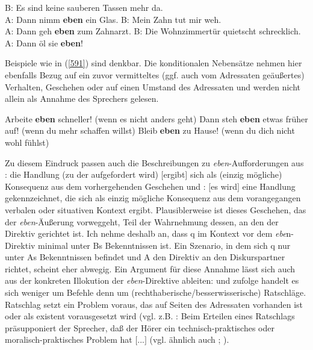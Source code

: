 \begin{exe}
	\ex\label{590} 
		\begin{xlist}	
			\ex\label{590a} B: Es sind keine sauberen Tassen mehr da.\\
							A: Dann nimm \textbf{eben} ein Glas.
			\ex\label{590b} B: Mein Zahn tut mir weh.\\
							A: Dann geh \textbf{eben} zum Zahnarzt.
			\ex\label{590c} B: Die Wohnzimmertür quietscht schrecklich.\\
							A: Dann öl sie \textbf{eben}!
			\hfill\hbox {\citet[105/101/101]{Dahl1988}}
		\end{xlist}
\end{exe}
Beispiele wie in (\ref{591}) sind denkbar. Die konditionalen Nebensätze nehmen hier ebenfalls Bezug auf ein zuvor vermitteltes (ggf. auch vom Adressaten geäußertes) Verhalten, Geschehen oder auf einen Umstand des Adressaten und werden nicht allein als Annahme des Sprechers gelesen.
\begin{exe}
	\ex\label{591} 
		\begin{xlist}	
			\ex\label{591a} Arbeite \textbf{eben} schneller! (wenn es nicht anders geht)
			\ex\label{591b} Dann steh \textbf{eben} etwas früher auf! (wenn du mehr schaffen willst)
			\ex\label{591c} Bleib \textbf{eben} zu Hause! (wenn du dich nicht wohl fühlst)
			\hfill\hbox {\citet[122]{Helbig1990}}
		\end{xlist}
\end{exe}
Zu diesem Eindruck passen auch die Beschreibungen zu \textit{eben}-Aufforderungen aus \citet[121]{Helbig1990}: \glqq die Handlung (zu der aufgefordert wird) $[$ergibt$]$ sich als (einzig mögliche) Konsequenz aus dem vorhergehenden Geschehen\grqq{}  und \citet[169]{Hentschel1986}: \glqq $[$es wird$]$ eine Handlung gekennzeichnet, die sich als einzig mögliche Konsequenz aus dem vorangegangen verbalen oder situativen Kontext ergibt\grqq{}. Plausiblerweise ist dieses Geschehen, das der \textit{eben}-Äußerung vorweggeht, Teil der Wahrnehmung dessen, an den der Direktiv gerichtet ist. Ich nehme deshalb an, dass q im Kontext vor dem \textit{ebe}n-Direktiv minimal unter Bs Bekenntnissen ist. Ein Szenario, in dem sich q nur unter As Bekenntnissen befindet und A den Direktiv an den Diskurspartner richtet, scheint eher abwegig. Ein Argument für diese Annahme lässt sich auch aus der konkreten Illokution der \textit{eben}-Direktive ableiten: \citet[102]{Dahl1988} und \citet[122]{Thurmair1989} zufolge handelt es sich weniger um Befehle  denn um (rechthaberische/besserwisserische)  Ratschläge. Ratschlag setzt ein Problem voraus, das auf Seiten des Adressaten vorhanden ist oder als existent vorausgesetzt wird (vgl. z.B. \citealt[186]{Rolf1997}: \glqq  Beim Erteilen eines Ratschlags präsupponiert der Sprecher, daß der Hörer ein technisch-praktisches oder moralisch-praktisches Problem hat $[$...$]$\grqq{} (vgl. ähnlich auch \citealt[409]{Hindelang1978}; \citeyear[59]{Hindelang2010}).

